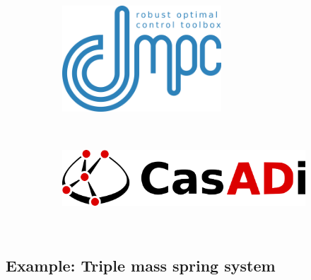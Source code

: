 \documentclass[
  letterpaper,
  DIV=11,
  numbers=noendperiod,
  oneside]{scrartcl}
\begin{document}
\begin{figure}

\begin{minipage}{0.50\linewidth}

\begin{figure}[H]

{\centering \includegraphics[width=\textwidth,height=1.5625in]{figs/package_dompc.png}

}


\end{figure}%

\end{minipage}%
%
\begin{minipage}{0.50\linewidth}

\begin{figure}[H]

{\centering \includegraphics[width=\textwidth,height=1.5625in]{figs/casadi_logo.png}

}


\end{figure}%

\end{minipage}%

\end{figure}%

\subsection{Example: Triple mass spring
system}\label{example-triple-mass-spring-system}
\end{document}
